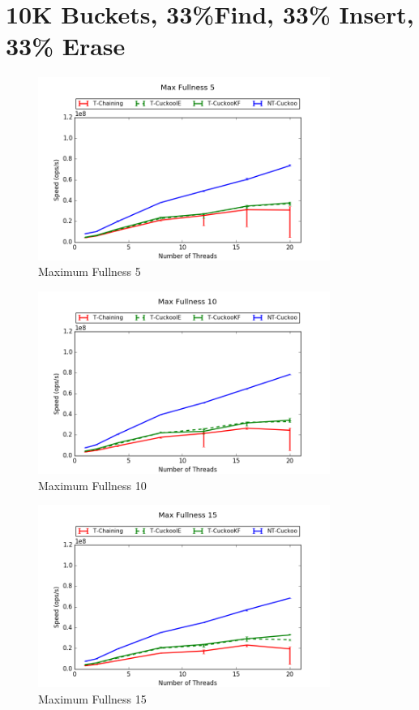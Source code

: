 
\section{10K Buckets, 33\%Find, 33\% Insert, 33\% Erase}
\begin{figure}[H]
    \centering
	\includegraphics[width=0.85\textwidth]{maps/5HM10K:F34,I33,E33.png} 
        \caption*{Maximum Fullness 5}
    \end{figure}
\begin{figure}[H]
    \centering
	\includegraphics[width=0.85\textwidth]{maps/10HM10K:F34,I33,E33.png} 
        \caption*{Maximum Fullness 10}
    \end{figure}
\begin{figure}[H]
    \centering
	\includegraphics[width=0.85\textwidth]{maps/15HM10K:F34,I33,E33.png} 
        \caption*{Maximum Fullness 15}
    \end{figure}

